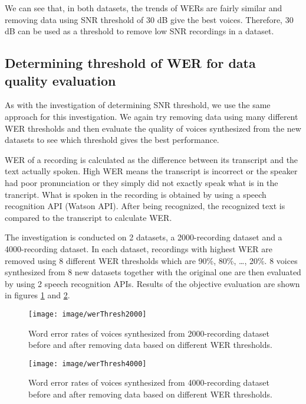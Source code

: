 \documentclass[12pt]{article}
\begin{document}
We can see that, in both datasets, the trends of WERs are fairly similar and removing data using SNR threshold of 30 dB give the best voices. Therefore, 30 dB can be used as a threshold to remove low SNR recordings in a dataset.

\subsection{Determining threshold of WER for data quality evaluation}
As with the investigation of determining SNR threshold, we use the same approach for this investigation. We again try removing data using many different WER thresholds and then evaluate the quality of voices synthesized from the new datasets to see which threshold gives the best performance.

WER of a recording is calculated as the difference between its transcript and the text actually spoken. High WER means the transcript is incorrect or the speaker had poor pronunciation or they simply did not exactly speak what is in the trancript. What is spoken in the recording is obtained by using a speech recognition API (Watson API). After being recognized, the recognized text is compared to the transcript to calculate WER.

The investigation is conducted on 2 datasets, a 2000-recording dataset and a 4000-recording dataset. In each dataset, recordings with highest WER are removed using 8 different WER thresholds which are 90\%, 80\%, …, 20\%. 8 voices synthesized from 8 new datasets together with the original one are then evaluated by using 2 speech recognition APIs. Results of the objective evaluation are shown in figures \ref{fig_werThresh2000} and \ref{fig_werThresh4000}.

\begin{figure}[t]
\begin{center}
\texttt{[image: image/werThresh2000]}
\end{center}
\vspace{-0.3cm}
\caption[WER thresholds 2000.]{Word error rates of voices synthesized from 2000-recording dataset before and after removing data based on different WER thresholds.}
\label{fig_werThresh2000}
\end{figure}

\begin{figure}[t]
\begin{center}
\texttt{[image: image/werThresh4000]}
\end{center}
\vspace{-0.3cm}
\caption[WER thresholds 4000.]{Word error rates of voices synthesized from 4000-recording dataset before and after removing data based on different WER thresholds.}
\label{fig_werThresh4000}
\end{figure}
\end{document}
